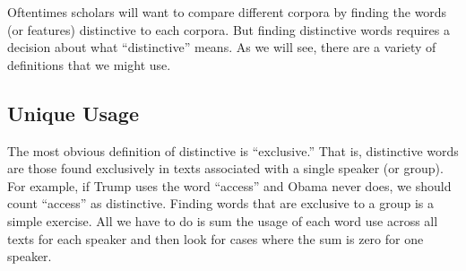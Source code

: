 \documentclass[]{book}
\begin{document}
Oftentimes scholars will want to compare different corpora by finding
the words (or features) distinctive to each corpora. But finding
distinctive words requires a decision about what ``distinctive'' means.
As we will see, there are a variety of definitions that we might use.

\subsection{Unique Usage}\label{unique-usage}

The most obvious definition of distinctive is ``exclusive.'' That is,
distinctive words are those found exclusively in texts associated with a
single speaker (or group). For example, if Trump uses the word
``access'' and Obama never does, we should count ``access'' as
distinctive. Finding words that are exclusive to a group is a simple
exercise. All we have to do is sum the usage of each word use across all
texts for each speaker and then look for cases where the sum is zero for
one speaker.
\end{document}
